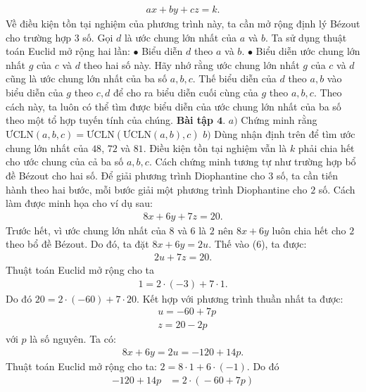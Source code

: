 \begin{multicols}{2}
	\begin{align*}
		ax+by+cz=k.
	\end{align*}
	Về điều kiện tồn tại nghiệm của phương trình này, ta cần mở rộng định lý Bézout cho trường hợp $3$ số.
	\vskip 0.1cm
	Gọi $d$ là ước chung lớn nhất của $a$ và $b$. Ta sử dụng thuật toán Euclid mở rộng hai lần: 
	\vskip 0.1cm
	$\bullet$ Biểu diễn $d$ theo $a$ và $b$.
	\vskip 0.1cm 
	$\bullet$ Biểu diễn ước chung lớn nhất $g$ của $c$ và $d$ theo hai số này. Hãy nhớ rằng ước chung lớn nhất $g$ của $c$ và $d$ cũng là ước chung lớn nhất của ba số $a,b,c$.
	\vskip 0.1cm
	Thế biểu diễn của $d$ theo $a,b$ vào biểu diễn của $g$ theo $c,d$ để cho ra biểu diễn cuối cùng của $g$ theo $a,b,c$.
	\vskip 0.1cm 
	Theo cách này, ta luôn có thể tìm được biểu diễn của ước chung lớn nhất của ba số theo một tổ hợp tuyến tính của chúng.
	\vskip 0.1cm
	\textbf{\color{hoccungpi}Bài tập $\pmb{4.}$}
	$a)$ Chứng minh rằng $\text{ƯCLN}(a,b,c) = \text{ƯCLN}(\text{ƯCLN}(a,b), c)$
	\vskip 0.1cm
	$b)$ Dùng nhận định trên để tìm ước chung lớn nhất của $48$, $72$ và $81$.
	\vskip 0.1cm
	Điều kiện tồn tại nghiệm vẫn là $k$ phải chia hết cho ước chung của cả ba số $a,b,c$. Cách chứng minh tương tự như trường hợp bổ đề Bézout cho hai số.
	\vskip 0.1cm
	Để giải phương trình Diophantine cho $3$ số, ta cần tiến hành theo hai bước, mỗi bước giải một phương trình Diophantine cho $2$ số. Cách làm được minh họa cho ví dụ sau:
	\begin{align*}
		8x+6y+7z=20. \tag{$6$}
	\end{align*}
	Trước hết, vì ước chung lớn nhất của $8$ và $6$ là $2$ nên $8x+6y$ luôn chia hết cho $2$ theo bổ đề Bézout. Do đó, ta đặt $8x+6y=2u$. Thế vào ($6$), ta được:
	\begin{align*}
		2u+7z=20.
	\end{align*}
	Thuật toán Euclid mở rộng cho ta
	\begin{align*}
		1=2\cdot (-3)+7\cdot 1.
	\end{align*}
	Do đó $20=2\cdot (-60)+7\cdot 20$. Kết hợp với phương trình thuần nhất ta được:
	\begin{align*}
		&u=-60+7p\\
		&z=20-2p
	\end{align*}
	với $p$ là số nguyên.
	\vskip 0.1cm
	Ta có:
	\begin{align*}
		8x+6y=2u=-120+14p.
	\end{align*}
	Thuật toán Euclid mở rộng cho ta: $2=8\cdot 1+6\cdot (-1)$. Do đó 
	\begin{align*}
		-120+14p&=2\!\cdot\! (\!-\!60\!+\!7p)\\

\end{align*}
\end{multicols}
